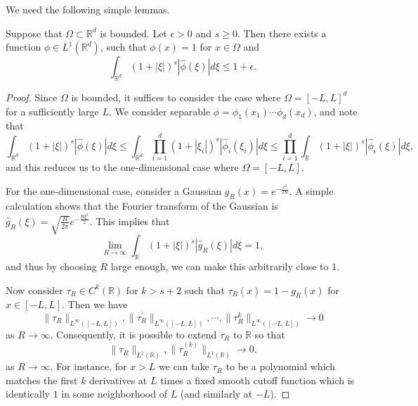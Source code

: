 We need the following simple lemmas.
\begin{lemma}\label{fourier-cutoff-lemma}
  Suppose that $\Omega\subset \mathbb{R}^d$ is bounded. Let $\epsilon > 0$ and $s\geq 0$. Then there exists a function $\phi\in L^1(\mathbb{R}^d)$, such that $\phi(x) = 1$ for $x\in \Omega$ and 
  \begin{equation}
  \int_{\mathbb{R}^d}(1+|\xi|)^s|\hat{\phi}(\xi)|d\xi \leq 1 + \epsilon.
  \end{equation}
 \end{lemma}
 \begin{proof}
  Since $\Omega$ is bounded, it suffices to consider the case where $\Omega = [-L,L]^d$ for a sufficiently large $L$. We consider separable $\phi = \phi_1(x_1)\cdots\phi_d(x_d)$, and note that
  \begin{equation}
   \int_{\mathbb{R}^d}(1+|\xi|)^s|\hat{\phi}(\xi)|d\xi \leq \int_{\mathbb{R}^d}\prod_{i=1}^d(1+|\xi_i|)^s|\hat{\phi}_i(\xi_i)|d\xi \leq \prod_{i=1}^d \int_{\mathbb{R}}(1+|\xi|)^s|\hat{\phi}_i(\xi)|d\xi,
  \end{equation}
  and this reduces us to the one-dimensional case where $\Omega = [-L,L]$.
  
  For the one-dimensional case, consider a Gaussian $g_R(x) = e^{-\frac{x^2}{2R}}$. A simple calculation shows that the Fourier transform of the Gaussian is $\hat{g}_R(\xi) = \sqrt{\frac{R}{2\pi}}e^{-\frac{R\xi^2}{2}}$. This implies that
  \begin{equation}
   \lim_{R\rightarrow \infty} \int_{\mathbb{R}}(1+|\xi|)^s|\hat{g}_R(\xi)|d\xi = 1,
  \end{equation}
  and thus by choosing $R$ large enough, we can make this arbitrarily close to $1$.
  
  Now consider $\tau_R\in C^{k}(\mathbb{R})$ for $k > s+2$ such that $\tau_R(x) = 1 - g_R(x)$ for $x\in [-L,L]$. Then we have 
  $$\|\tau_R\|_{L^\infty([-L,L])}, \|\tau_R^\prime\|_{L^\infty([-L,L])}, \cdots, \|\tau_R^{k}\|_{L^\infty([-L,L])} \rightarrow 0$$
  as $R\rightarrow \infty$.
 Consequently, it is possible to extend $\tau_R$ to $\mathbb{R}$ so that
 \begin{equation}
  \|\tau_R\|_{L^1(\mathbb{R})}, \|\tau_R^{(k)}\|_{L^1(\mathbb{R})} \rightarrow 0.
 \end{equation}
 as $R\rightarrow \infty$. For instance, for $x > L$ we can take $\tau_R$ to be a polynomial which matches the first $k$ derivatives at $L$ times a fixed smooth cutoff function which is identically $1$ in some neighborhood of $L$ (and similarly at $-L$).
 

\end{proof}
